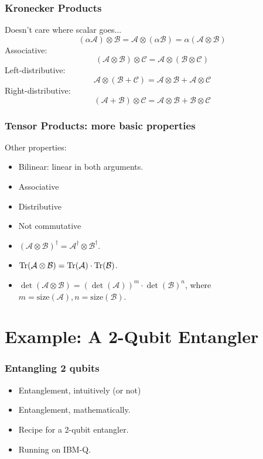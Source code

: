 \documentclass{beamer}
\theoremstyle{definition}
\newcommand{\A}{\mathcal{A}}
\newcommand{\B}{\mathcal{B}}
\begin{document}
\begin{frame}
\frametitle{Kronecker Products}
Doesn't care where scalar goes...
$$ (\alpha \A) \otimes \B = \A \otimes (\alpha \B) = \alpha(\A \otimes \B)$$
Associative: $$(\A \otimes \B) \otimes \mathcal{C} = \A \otimes (\B \otimes \mathcal{C})$$
Left-distributive: $$\A \otimes (\B + \mathcal{C}) = \A\otimes \B + \A \otimes \mathcal{C}$$
Right-distributive: $$(\A + \B)\otimes \mathcal{C} = \A \otimes \mathcal{B} + \B \otimes \mathcal{C}$$
\end{frame}





\begin{frame}
\frametitle{Tensor Products: more basic properties}
Other properties:
\begin{itemize}
	\item Bilinear: linear in both arguments.
	\item Associative
	\item Distributive
	\item Not commutative
	\item $(\A \otimes \B)^\dagger = \A^\dagger \otimes \B^\dagger$.
	\item $\Tr(\A\otimes \B) = \Tr(\A)\cdot \Tr(\B)$.
	\item $\det(\A \otimes \B) = (\det(\A))^m\cdot \det(\B)^n$, where $m = \text{size}(\A), n =\text{size}(\B)$. 
\end{itemize}
\end{frame}




















\section{Example: A 2-Qubit Entangler}


\begin{frame}
\frametitle{Entangling 2 qubits}
\begin{itemize}
	\item Entanglement, intuitively (or not)
	\item Entanglement, mathematically. 
	\item Recipe for a 2-qubit entangler.
	\item Running on IBM-Q.
\end{itemize}
\end{frame}
\end{document}
